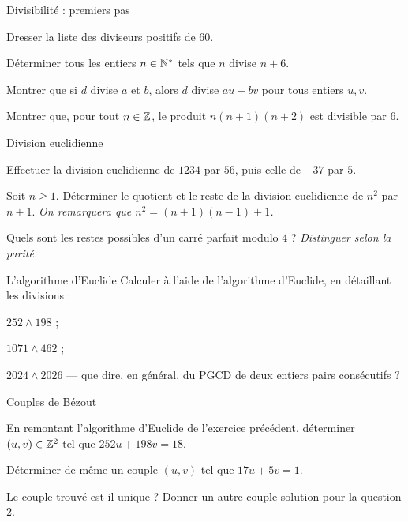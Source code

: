 \exercices
{}

\begin{exercice}[1]{Divisibilité : premiers pas}
\begin{questions}
  \item Dresser la liste des diviseurs positifs de $60$.
  \item Déterminer tous les entiers $n\in\mathbb{N}^{*}$ tels que $n$ divise $n+6$.
  \item Montrer que si $d$ divise $a$ et $b$, alors $d$ divise $au+bv$ pour
    tous entiers $u,v$.
  \item Montrer que, pour tout $n\in\mathbb{Z}$, le produit $n(n+1)(n+2)$ est
    divisible par $6$.
\end{questions}
\end{exercice}

\begin{exercice}[1]{Division euclidienne}
\begin{questions}
  \item Effectuer la division euclidienne de $1234$ par $56$, puis celle de
    $-37$ par $5$.
  \item Soit $n\geq1$. Déterminer le quotient et le reste de la division
    euclidienne de $n^{2}$ par $n+1$.
    \emph{On remarquera que $n^{2}=(n+1)(n-1)+1$.}
  \item Quels sont les restes possibles d'un carré parfait modulo $4$ ?
    \emph{Distinguer selon la parité.}
\end{questions}
\end{exercice}

\begin{exercice}[1]{L'algorithme d'Euclide}
Calculer à l'aide de l'algorithme d'Euclide, en détaillant les divisions :
\begin{questions}
  \item $252\wedge198$ ;
  \item $1071\wedge462$ ;
  \item $2024\wedge2026$ — que dire, en général, du PGCD de deux entiers
    pairs consécutifs ?
\end{questions}
\end{exercice}

\begin{exercice}[1]{Couples de Bézout}
\begin{questions}
  \item En remontant l'algorithme d'Euclide de l'exercice précédent,
    déterminer $(u,v)\in\mathbb{Z}^{2}$ tel que $252u+198v=18$.
  \item Déterminer de même un couple $(u,v)$ tel que $17u+5v=1$.
  \item Le couple trouvé est-il unique ? Donner un autre couple solution
    pour la question 2.
\end{questions}
\end{exercice}

